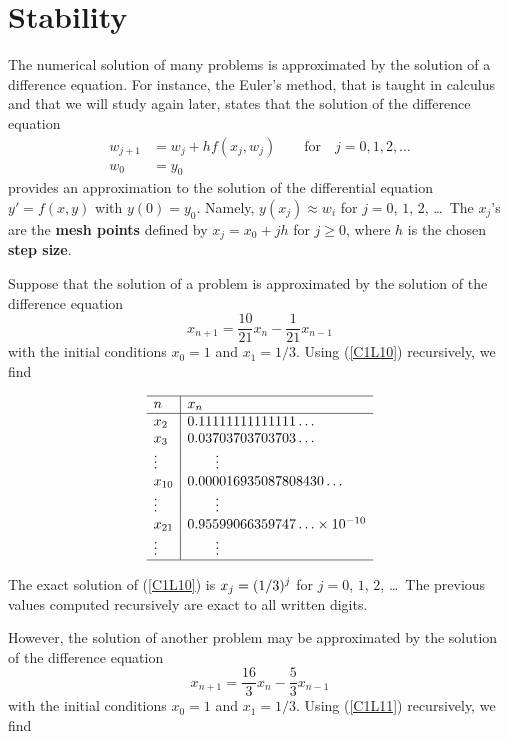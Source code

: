\section{Stability}

The numerical solution of many problems is approximated by the
solution of a difference equation.  For instance, the Euler's method,
that is taught in calculus and that we will study again later, states
that the solution of the difference equation
\begin{align*}
w_{j+1} &= w_j + h f(x_j,w_j) \qquad \text{for} \quad j=0, 1, 2, \ldots \\
w_0 &= y_0
\end{align*}
provides an approximation to the solution of the differential equation 
$y'=f(x,y)$ with $y(0)=y_0$.  Namely, $y(x_j) \approx w_i$ for $j=0$,
$1$, $2$, \ldots\  The $x_j$'s are the
{\bfseries mesh points} defined
by $x_j = x_0 + j h$ for $j\geq 0$, where $h$ is the chosen
{\bfseries step size}.

Suppose that the solution of a problem is approximated by the solution
of the difference equation
\begin{equation} \label{C1L10}
x_{n+1} = \frac{10}{21} x_n - \frac{1}{21}x_{n-1}
\end{equation}
with the initial conditions $x_0 = 1$ and $x_1 = 1/3$.  Using
(\ref{C1L10}) recursively, we find

\[
\begin{array}{l|l}
\hline
n & x_n \\
\hline
x_2 & 0.11111111111111\ldots \\
x_3 & 0.03703703703703\ldots \\
\vdots & \qquad \vdots \\
x_{10} & 0.000016935087808430\ldots \\
\vdots & \qquad \vdots \\
x_{21} & 0.95599066359747\ldots \times 10^{-10} \\
\vdots & \qquad \vdots \\
\hline
\end{array}
\]

The exact solution of (\ref{C1L10}) is $\displaystyle x_j = (1/3)^j$ for
$j=0$, $1$, $2$, \ldots\  The previous values computed recursively are
exact to all written digits.

However, the solution of another problem may be approximated by the
solution of the difference equation
\begin{equation} \label{C1L11}
x_{n+1} = \frac{16}{3} x_n - \frac{5}{3}x_{n-1}
\end{equation}
with the initial conditions $x_0 = 1$ and $x_1 = 1/3$.
Using (\ref{C1L11}) recursively, we find

